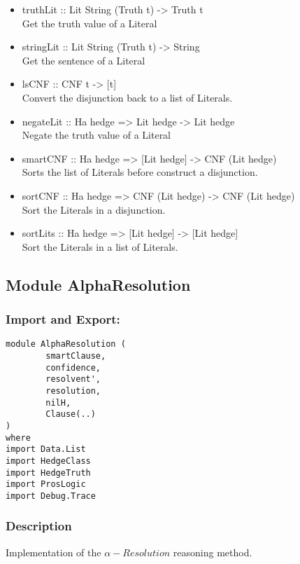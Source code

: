 \documentclass[../gr-final.tex]{subfiles}
\begin{document}
\begin{itemize}
\item truthLit :: Lit String (Truth t) -> Truth t\\
                Get the truth value of a Literal
        \item stringLit :: Lit String (Truth t) -> String\\
                Get the sentence of a Literal
        \item lsCNF :: CNF t -> [t]\\
                Convert the disjunction back to a list of
                Literals.
        \item negateLit :: Ha hedge => Lit hedge -> Lit hedge\\
                Negate the truth value of a Literal
        \item smartCNF :: Ha hedge => [Lit hedge] -> CNF (Lit
                hedge)\\
                Sorts the list of Literals before construct a
                disjunction.
        \item sortCNF :: Ha hedge => CNF (Lit hedge) -> CNF (Lit
                hedge)\\
                Sort the Literals in a disjunction.
        \item sortLits :: Ha hedge => [Lit hedge] -> [Lit
                hedge]\\
                Sort the Literals in a list of Literals.
\end{itemize}

\subsection{Module AlphaResolution}
\subsubsection{Import and Export:}
\begin{lstlisting}
module AlphaResolution (
        smartClause,
        confidence,
        resolvent',
        resolution,
        nilH,
        Clause(..)
)
where
import Data.List
import HedgeClass
import HedgeTruth
import ProsLogic
import Debug.Trace
\end{lstlisting}
\subsubsection{Description}
Implementation of the $\alpha-Resolution$ reasoning method.
\end{document}
